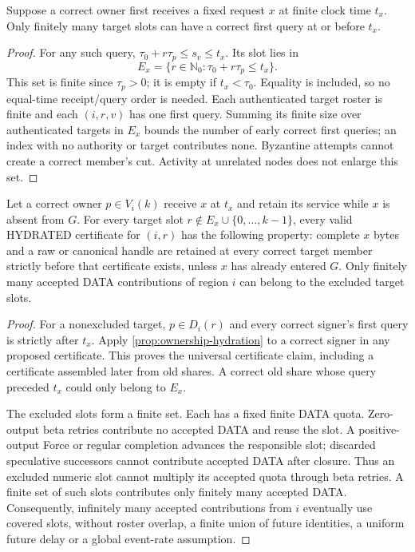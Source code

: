\begin{proposition}
\label{prop:ownership-finite-exceptions}
Suppose a correct owner first receives a fixed request $x$ at finite
clock time $t_x$. Only finitely many target slots can have a correct
first query at or before $t_x$.
\end{proposition}
\begin{proof}
For any such query,
$\tau_0+r\tau_p\le s_v\le t_x$. Its slot lies in
\[
 E_x=\{r\in\mathbb N_0:\tau_0+r\tau_p\le t_x\}.
\]
This set is finite since $\tau_p>0$; it is empty if $t_x<\tau_0$.
Equality is included, so no equal-time receipt/query order is needed.
Each authenticated target roster is finite and each $(i,r,v)$ has one
first query. Summing its finite size over authenticated targets in
$E_x$ bounds the number of early correct first queries; an index with
no authority or target contributes none. Byzantine attempts cannot
create a correct member's cut.
Activity at unrelated nodes does not enlarge this set.
\end{proof}

\begin{proposition}
\label{prop:ownership-coverage}
Let a correct owner $p\in V_i(k)$ receive $x$ at $t_x$ and retain its
service while $x$ is absent from $G$. For every target slot
$r\notin E_x\cup\{0,\ldots,k-1\}$, every valid HYDRATED certificate
for $(i,r)$ has the following property: complete $x$ bytes and a raw
or canonical handle are retained at every correct target member
strictly before that certificate exists, unless $x$ has already
entered $G$. Only finitely many accepted DATA contributions of region
$i$ can belong to the excluded target slots.
\end{proposition}
\begin{proof}
For a nonexcluded target, $p\in D_i(r)$ and every correct signer's
first query is strictly after $t_x$. Apply
\cref{prop:ownership-hydration} to a correct signer in any proposed
certificate. This proves the universal certificate claim, including
a certificate assembled later from old shares. A correct old share
whose query preceded $t_x$ could only belong to $E_x$.

The excluded slots form a finite set. Each has a fixed finite DATA
quota. Zero-output beta retries contribute no accepted DATA and reuse
the slot. A positive-output Force or regular completion advances the
responsible slot; discarded speculative successors cannot contribute
accepted DATA after closure. Thus an excluded numeric slot cannot
multiply its accepted quota through beta retries. A finite set of such
slots contributes only finitely many accepted DATA. Consequently,
infinitely many accepted contributions from $i$ eventually use covered
slots, without roster overlap, a finite union of future identities, a
uniform future delay or a global event-rate assumption.
\end{proof}


